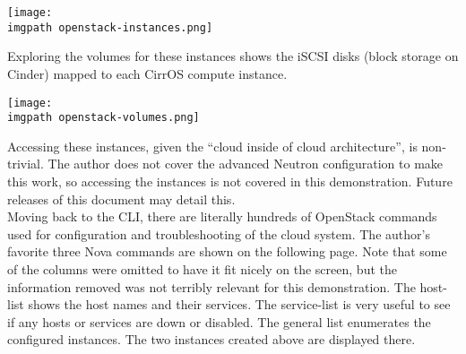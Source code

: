     \begin{minipage}[t]{\linewidth}
	  \centering
      \texttt{[image: \\imgpath openstack-instances.png]}
    \end{minipage}

Exploring the volumes for these instances shows the iSCSI disks (block storage
on Cinder) mapped to each CirrOS compute instance.

    \begin{minipage}[t]{\linewidth}
	  \centering
      \texttt{[image: \\imgpath openstack-volumes.png]}
    \end{minipage}

Accessing these instances, given the ``cloud inside of cloud architecture'',
is non-trivial. The author does not cover the advanced Neutron configuration
to make this work, so accessing the instances is not covered in this
demonstration. Future releases of this document may detail this. \\

Moving back to the CLI, there are literally hundreds of OpenStack commands
used for configuration and troubleshooting of the cloud system. The author’s
favorite three Nova commands are shown on the following page. Note that some
of the columns were omitted to have it fit nicely on the screen, but the
information removed was not terribly relevant for this demonstration. The
host-list shows the host names and their services. The service-list is very
useful to see if any hosts or services are down or disabled. The general list
enumerates the configured instances. The two instances created above are
displayed there.

